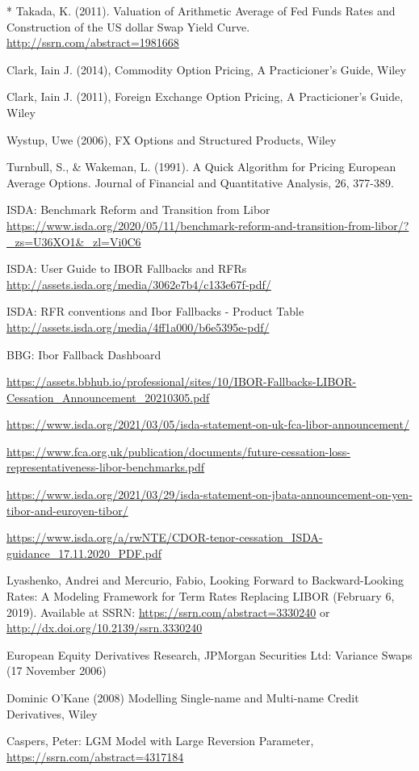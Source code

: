\begin{thebibliography}{*}
 Takada, K. (2011). Valuation of Arithmetic Average of Fed Funds Rates and Construction of the US dollar Swap Yield Curve. \url{http://ssrn.com/abstract=1981668}

 Clark, Iain J. (2014), Commodity Option Pricing, A Practicioner's Guide, Wiley

 Clark, Iain J. (2011), Foreign Exchange Option Pricing, A Practicioner's Guide, Wiley

 Wystup, Uwe (2006), FX Options and Structured Products, Wiley

 Turnbull, S., \& Wakeman, L. (1991). A Quick Algorithm for Pricing European Average
  Options. Journal of Financial and Quantitative Analysis, 26, 377-389.

 ISDA: Benchmark Reform and Transition from Libor \url{https://www.isda.org/2020/05/11/benchmark-reform-and-transition-from-libor/?_zs=U36XO1&_zl=Vi0C6}

 ISDA: User Guide to IBOR Fallbacks and RFRs \url{http://assets.isda.org/media/3062e7b4/c133e67f-pdf/}

 ISDA: RFR conventions and Ibor Fallbacks - Product Table \url{http://assets.isda.org/media/4ff1a000/b6e5395e-pdf/}

 BBG: Ibor Fallback Dashboard

 \url{https://assets.bbhub.io/professional/sites/10/IBOR-Fallbacks-LIBOR-Cessation_Announcement_20210305.pdf}

 \url{https://www.isda.org/2021/03/05/isda-statement-on-uk-fca-libor-announcement/}

 \url{https://www.fca.org.uk/publication/documents/future-cessation-loss-representativeness-libor-benchmarks.pdf}

 \url{https://www.isda.org/2021/03/29/isda-statement-on-jbata-announcement-on-yen-tibor-and-euroyen-tibor/}

 \url{https://www.isda.org/a/rwNTE/CDOR-tenor-cessation_ISDA-guidance_17.11.2020_PDF.pdf}

 Lyashenko, Andrei and Mercurio, Fabio, Looking Forward to Backward-Looking Rates: A Modeling Framework for Term Rates Replacing LIBOR (February 6, 2019). Available at SSRN: \url{https://ssrn.com/abstract=3330240} or \url{http://dx.doi.org/10.2139/ssrn.3330240}

 European Equity Derivatives Research, JPMorgan Securities Ltd: Variance Swaps (17 November 2006)

 Dominic O'Kane (2008) Modelling Single-name and Multi-name Credit Derivatives, Wiley

 Caspers, Peter: LGM Model with Large Reversion Parameter, \url{https://ssrn.com/abstract=4317184}

\end{thebibliography}

